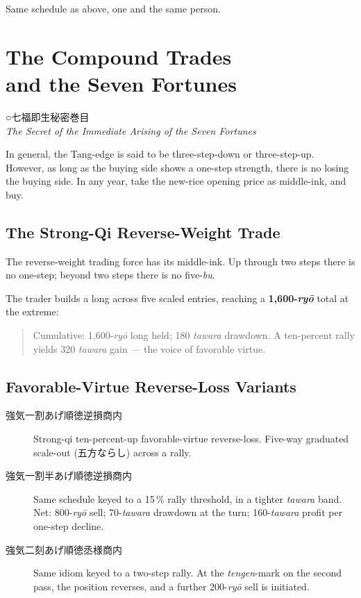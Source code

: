 \documentclass[10pt, openany]{book}
\newcommand{\jp}[1]{{\japanesefont #1}}
\begin{document}
Same schedule as above, one and the same person.

\chapter{The Compound Trades\\ and the Seven Fortunes}

\begin{center}
\jp{○七福即生秘密巻目}\\[0.3em]
\textit{The Secret of the Immediate Arising of the Seven Fortunes}
\end{center}

In general, the Tang-edge is said to be three-step-down or
three-step-up. However, as long as the buying side shows a
one-step strength, there is no losing the buying side. In any year,
take the new-rice opening price as middle-ink, and buy.

\section{The Strong-Qi Reverse-Weight Trade}

The reverse-weight trading force has its middle-ink. Up through
two steps there is no one-step; beyond two steps there is no
five-\textit{bu}.

The trader builds a long across five scaled entries, reaching a
\textbf{1{,}600-\textit{ry\=o}} total at the extreme:

\begin{quote}
Cumulative: 1{,}600-\textit{ry\=o} long held; 180 \textit{tawara}
drawdown. A ten-percent rally yields 320 \textit{tawara} gain ---
the voice of favorable virtue.
\end{quote}

\section{Favorable-Virtue Reverse-Loss Variants}

\begin{description}
\item[\jp{強気一割あげ順徳逆損商内}] Strong-qi ten-percent-up
favorable-virtue reverse-loss. Five-way graduated scale-out
(\jp{五方ならし}) across a rally.

\item[\jp{強気一割半あげ順徳逆損商内}] Same schedule keyed to a
15\,\% rally threshold, in a tighter \textit{tawara} band. Net:
800-\textit{ry\=o} sell; 70-\textit{tawara} drawdown at the turn;
160-\textit{tawara} profit per one-step decline.

\item[\jp{強気二刻あげ順徳丞様商内}] Same idiom keyed to a two-step
rally. At the \textit{tengen}-mark on the second pass, the position
reverses, and a further 200-\textit{ry\=o} sell is initiated.
\end{description}
\end{document}
